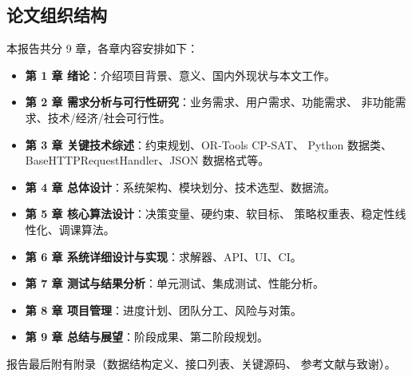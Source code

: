 \subsection{论文组织结构}

本报告共分 9 章，各章内容安排如下：
\begin{itemize}[leftmargin=2em,itemsep=0.1em]
\item \textbf{第 1 章 绪论}：介绍项目背景、意义、国内外现状与本文工作。
\item \textbf{第 2 章 需求分析与可行性研究}：业务需求、用户需求、功能需求、
非功能需求、技术/经济/社会可行性。
\item \textbf{第 3 章 关键技术综述}：约束规划、OR-Tools CP-SAT、
Python 数据类、BaseHTTPRequestHandler、JSON 数据格式等。
\item \textbf{第 4 章 总体设计}：系统架构、模块划分、技术选型、数据流。
\item \textbf{第 5 章 核心算法设计}：决策变量、硬约束、软目标、
策略权重表、稳定性线性化、调课算法。
\item \textbf{第 6 章 系统详细设计与实现}：求解器、API、UI、CI。
\item \textbf{第 7 章 测试与结果分析}：单元测试、集成测试、性能分析。
\item \textbf{第 8 章 项目管理}：进度计划、团队分工、风险与对策。
\item \textbf{第 9 章 总结与展望}：阶段成果、第二阶段规划。
\end{itemize}

报告最后附有附录（数据结构定义、接口列表、关键源码、
参考文献与致谢）。
